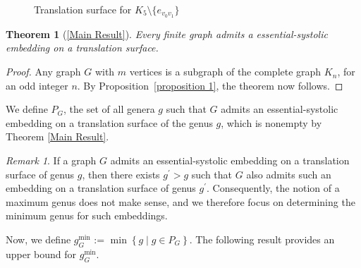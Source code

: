 \documentclass[11pt]{amsart}
\theoremstyle{plain}
\newtheorem*{repthm}{Theorem}
\theoremstyle{definition}
\theoremstyle{remark}
\newtheorem{remark}[theorem]{Remark}
\numberwithin{equation}{section}
\numberwithin{figure}{section}
\begin{document}
\begin{figure}[htbp]
\begin{center}
\caption{Translation surface for $K_5\setminus\{e_{v_0v_1}\}$}
\label{figure21}
\end{center}
\end{figure}

\begin{repthm}[\ref{Main Result}]
  Every finite graph admits a essential-systolic embedding on a translation surface.  
\end{repthm}
\begin{proof}
Any graph $G$ with $m$ vertices is a subgraph of the complete graph $K_n$, for an odd integer $n$. By Proposition~\ref{proposition 1}, the theorem now follows.
\end{proof}

 We define $P_G$, the set of all genera $g$ such that $G$ admits an essential-systolic embedding on a translation surface of the genus $g$, which is nonempty by Theorem \ref{Main Result}. 
 \begin{remark}
If a graph $G$ admits an essential-systolic embedding on a translation surface of genus $g$, then there exists $g^\prime > g$ such that $G$ also admits such an embedding on a translation surface of genus $g^\prime$. Consequently, the notion of a maximum genus does not make sense, and we therefore focus on determining the minimum genus for such embeddings.

 \end{remark}
  Now, we define
$g^{\min}_G$ := $\min \left\{ g \mid g \in P_G \right\}$. The following result provides an upper bound for $g^{\min}_G$.
\end{document}
